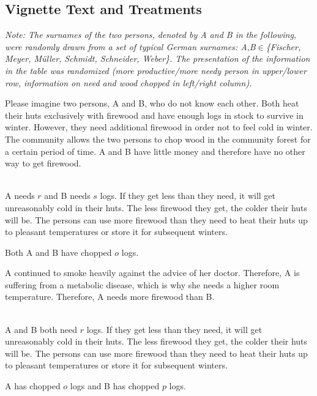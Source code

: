 \documentclass[smallcondensed]{svjour3}
\begin{document}
\subsection*{Vignette Text and Treatments}\label{sec:app_vignette_variations}
%
\textit{Note: The surnames of the two persons, denoted by A and B in the following, were randomly drawn from a set of typical German surnames: A,B$\in$\{Fischer, Meyer, M\"uller, Schmidt, Schneider, Weber\}. The presentation of the information in the table was randomized (more productive/more needy person in upper/lower row, information on need and wood chopped in left/right column).}\par
%
\vspace{1ex}
\noindent Please imagine two persons, A and B, who do not know each other. Both heat their huts exclusively with firewood and have enough logs in stock to survive in winter. However, they need additional firewood in order not to feel cold in winter. The community allows the two persons to chop wood in the community forest for a certain period of time. A and B have little money and therefore have no other way to get firewood.\par
%
\vspace{1ex}
\\
A needs $r$ and B needs $s$ logs. If they get less than they need, it will get unreasonably cold in their huts. The less firewood they get, the colder their huts will be. The persons can use more firewood than they need to heat their huts up to pleasant temperatures or store it for subsequent winters.\par
%
Both A and B have chopped $o$ logs.\par
%
A continued to smoke heavily against the advice of her doctor. Therefore, A is suffering from a metabolic disease, which is why she needs a higher room temperature. Therefore, A needs more firewood than B.\par
%
\vspace{1ex}
\\
A and B both need $r$ logs. If they get less than they need, it will get unreasonably cold in their huts. The less firewood they get, the colder their huts will be. The persons can use more firewood than they need to heat their huts up to pleasant temperatures or store it for subsequent winters.\par
%
A has chopped $o$ logs and B has chopped $p$ logs.\par
\end{document}
